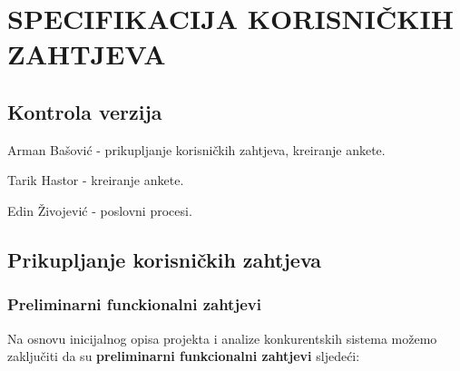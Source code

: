\sloppy
\chapter{SPECIFIKACIJA KORISNIČKIH ZAHTJEVA}

\sloppy
\section*{Kontrola verzija}


\noindent Arman Bašović - prikupljanje korisničkih zahtjeva, kreiranje ankete.

\noindent Tarik Hastor - kreiranje ankete.

\noindent Edin Živojević - poslovni procesi.

\sloppy
\section{Prikupljanje korisničkih zahtjeva}  
\subsection{Preliminarni funckionalni zahtjevi}
Na osnovu inicijalnog opisa projekta i analize konkurentskih sistema možemo zaključiti da su  \textbf{preliminarni funkcionalni zahtjevi} sljedeći:

